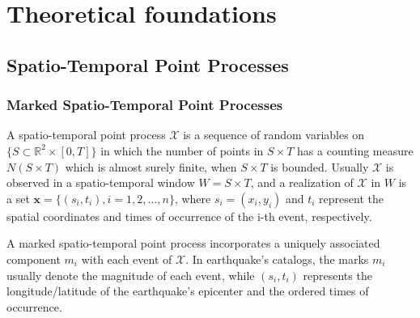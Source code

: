 \part{Theoretical foundations}

\chapter{Spatio-Temporal Point Processes}
\label{chap-point_proc}

\section{Marked Spatio-Temporal Point Processes}
\label{sec-mark_point}

A spatio-temporal point process $\mathcal{X}$ is a sequence of random variables on $\{S \subset \mathds{R}^{2} \times [0,T]\}$ in which the number of points in $S \times T$ has a counting measure $N(S \times T)$ which is almost surely finite, when $S \times T$ is bounded. Usually $\mathcal{X}$ is observed in a spatio-temporal window $W = S \times T$, and a realization of $\mathcal{X}$ in $W$ is a set $\mathbf{x} = \{(s_{i},t_{i}), i = 1,2,\ldots,n\}$, where $s_{i} = (x_{i},y_{i})$ and $t_{i}$ represent the spatial coordinates and times of occurrence of the i-th event, respectively.

A marked spatio-temporal point process incorporates a uniquely associated component $m_{i}$ with each event of $\mathcal{X}$. In earthquake's catalogs, the marks $m_{i}$ usually denote the magnitude of each event, while $(s_{i},t_{i})$ represents the longitude/latitude of the earthquake's epicenter and the ordered times of occurrence.

\begin{table}[htb]
\end{table}

